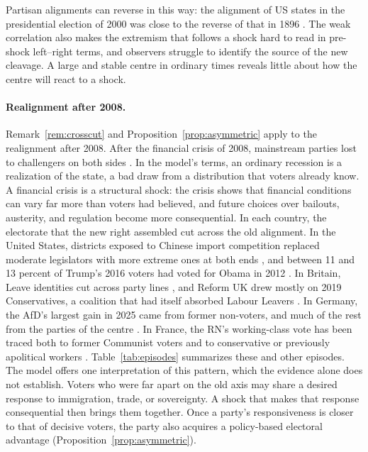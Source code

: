 \documentclass[12pt,letterpaper]{article}
\begin{document}
Partisan alignments can reverse in this way: the alignment of US states in the presidential election of 2000 was close to the reverse of that in 1896 \citep{MillerSchofield2003}. The weak correlation also makes the extremism that follows a shock hard to read in pre-shock left--right terms, and observers struggle to identify the source of the new cleavage. A large and stable centre in ordinary times reveals little about how the centre will react to a shock.

\paragraph{Realignment after 2008.}
Remark~\ref{rem:crosscut} and Proposition~\ref{prop:asymmetric} apply to the realignment after 2008. After the financial crisis of 2008, mainstream parties lost to challengers on both sides \citep{Funke2016,Hernandez2016}. In the model's terms, an ordinary recession is a realization of the state, a bad draw from a distribution that voters already know. A financial crisis is a structural shock: the crisis shows that financial conditions can vary far more than voters had believed, and future choices over bailouts, austerity, and regulation become more consequential. In each country, the electorate that the new right assembled cut across the old alignment. In the United States, districts exposed to Chinese import competition replaced moderate legislators with more extreme ones at both ends \citep{Autor2020}, and between 11 and 13 percent of Trump's 2016 voters had voted for Obama in 2012 \citep{Skelley2017}. In Britain, Leave identities cut across party lines \citep{HoboltLeeperTilley2021}, and Reform UK drew mostly on 2019 Conservatives, a coalition that had itself absorbed Labour Leavers \citep{HeathEtAl2024}. In Germany, the AfD's largest gain in 2025 came from former non-voters, and much of the rest from the parties of the centre \citep{NeuPokorny2025}. In France, the RN's working-class vote has been traced both to former Communist voters and to conservative or previously apolitical workers \citep{Perrineau1997,Mayer2002}. Table~\ref{tab:episodes} summarizes these and other episodes. The model offers one interpretation of this pattern, which the evidence alone does not establish. Voters who were far apart on the old axis may share a desired response to immigration, trade, or sovereignty. A shock that makes that response consequential then brings them together. Once a party's responsiveness is closer to that of decisive voters, the party also acquires a policy-based electoral advantage (Proposition~\ref{prop:asymmetric}).
\end{document}
